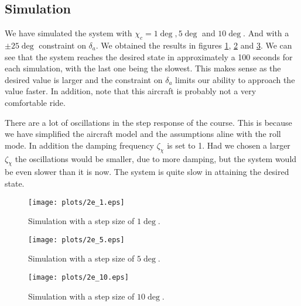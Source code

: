 \subsection{Simulation}

We have simulated the system with $\chi_c = 1 \deg, 5 \deg$ and $10 \deg.$ And with a $\pm 25 \deg$ constraint on $\delta_a$. We obtained the results in figures \ref{fig:2e_1}, \ref{fig:2e_5} and \ref{fig:2e_10}. 
We can see that the system reaches the desired state in approximately a 100 seconds for each simulation, with the last one being the slowest. This makes sense as the desired value is larger and the constraint on $\delta_a$ limits our ability to approach the value faster. In addition, note that this aircraft is probably not a very comfortable ride.

There are a lot of oscillations in the step response of the course. This is because we have simplified the aircraft model and the assumptions aline with the roll mode. In addition the damping frequency $\zeta_\chi$ is set to 1. Had we chosen a larger $\zeta_\chi$ the oscillations would be smaller, due to more damping, but the system would be even slower than it is now. The system is quite slow in attaining the desired state.


\begin{figure}[h!]
    \centering
    \texttt{[image: plots/2e\_1.eps]}
    \caption{Simulation with a step size of $1 \deg$.}
    \label{fig:2e_1}
\end{figure}

\begin{figure}[h!]
    \centering
    \texttt{[image: plots/2e\_5.eps]}
    \caption{Simulation with a step size of $5 \deg$.}
    \label{fig:2e_5}
\end{figure}

\begin{figure}[h!]
    \centering
    \texttt{[image: plots/2e\_10.eps]}
    \caption{Simulation with a step size of $10 \deg$.}
    \label{fig:2e_10}
\end{figure}

